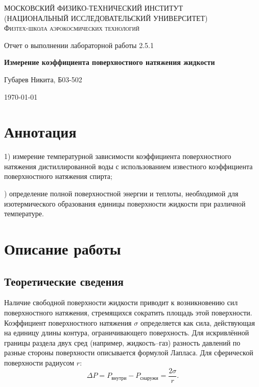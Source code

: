 \documentclass[a4paper]{article}
\begin{document}
	
	\begin{titlepage}
		\centering
		{\scshape\Large МОСКОВСКИЙ ФИЗИКО-ТЕХНИЧЕСКИЙ ИНСТИТУТ \\
			(НАЦИОНАЛЬНЫЙ ИССЛЕДОВАТЕЛЬСКИЙ УНИВЕРСИТЕТ)\\ %
			Физтех-школа аэрокосмических технологий}
		
		\vspace{4cm} %
		{\LARGE Отчет о выполнении лабораторной работы 2.5.1}
		\vspace{1cm} %
		
		{\huge\bf Измерение коэффициента поверхностного натяжения жидкости}
		
		\vspace{1cm} %
		\vfill %
		
		\begin{flushright} %
			{\LARGE Губарев Никита, Б03-502}
		\end{flushright}
		\vfill 
		\today %
	\end{titlepage}
	\tableofcontents 
	\section{Аннотация}
	1) измерение температурной зависимости  коэффициента поверхностного натяжения дистиллированной воды с использованием известного коэффициента поверхностного натяжения спирта;  
	
	) определение полной поверхностной энергии  и теплоты, необходимой для изотермического образования единицы  поверхности жидкости  при различной температуре. 
	\section{Описание работы}

	\subsection{Теоретические сведения}
	
	Наличие свободной поверхности жидкости приводит к возникновению сил поверхностного натяжения, стремящихся сократить площадь этой поверхности. Коэффициент поверхностного натяжения \(\sigma\) определяется как сила, действующая на единицу длины контура, ограничивающего поверхность. Для искривлённой границы раздела двух сред (например, жидкость–газ) разность давлений по разные стороны поверхности описывается формулой Лапласа. Для сферической поверхности радиусом \(r\):
	\[
	\Delta P = P_{\text{внутри}} - P_{\text{снаружи}} = \frac{2\sigma}{r}.
	\tag{1}
	\]
	
\end{document}
